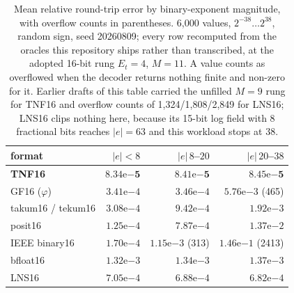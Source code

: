 \documentclass[11pt]{article}
\theoremstyle{definition}
\begin{document}
\begin{table}[t]\centering
\caption{Mean relative round-trip error by binary-exponent magnitude, with
overflow counts in parentheses. 6{,}000 values, $2^{-38}\ldots2^{38}$, random
sign, seed 20260809; every row recomputed from the oracles this repository ships
rather than transcribed, at the adopted 16-bit rung $E_t{=}4$, $M{=}11$. A value
counts as overflowed when the decoder returns nothing finite and non-zero for it.
Earlier drafts of this table carried the unfilled $M{=}9$ rung for TNF16 and
overflow counts of 1{,}324/1{,}808/2{,}849 for LNS16; LNS16 clips nothing here,
because its 15-bit log field with 8 fractional bits reaches $|e|=63$ and this
workload stops at 38.}
\label{tab:field}
\begin{tabular}{lrrr}
\toprule
format & $|e|<8$ & $|e|\,8$--$20$ & $|e|\,20$--$38$ \\
\midrule
\textbf{TNF16}    & $\mathbf{8.34\mathrm{e}{-5}}$ & $\mathbf{8.41\mathrm{e}{-5}}$ & $\mathbf{8.45\mathrm{e}{-5}}$ \\
GF16 ($\varphi$)   & $3.41\mathrm{e}{-4}$ & $3.46\mathrm{e}{-4}$ & $5.76\mathrm{e}{-3}$ (465) \\
takum16 / tekum16  & $3.08\mathrm{e}{-4}$ & $9.42\mathrm{e}{-4}$ & $1.92\mathrm{e}{-3}$ \\
posit16            & $1.25\mathrm{e}{-4}$ & $7.87\mathrm{e}{-4}$ & $1.37\mathrm{e}{-2}$ \\
IEEE binary16      & $1.70\mathrm{e}{-4}$ & $1.15\mathrm{e}{-3}$ (313) & $1.46\mathrm{e}{-1}$ (2413) \\
bfloat16           & $1.32\mathrm{e}{-3}$ & $1.34\mathrm{e}{-3}$ & $1.37\mathrm{e}{-3}$ \\
LNS16              & $7.05\mathrm{e}{-4}$ & $6.88\mathrm{e}{-4}$ & $6.82\mathrm{e}{-4}$ \\
\bottomrule
\end{tabular}
\end{table}
\end{document}
